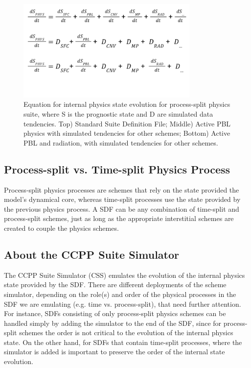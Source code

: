 \begin{figure}[h]
    \centering
    \includegraphics[width=0.80\textwidth]{images/CSS_tendency_schematic.png}
    \caption{Equation for internal physics state evolution for process-split physics suite, where S is the prognostic state and D are simulated data tendencies. Top) Standard Suite Definition File; Middle) Active PBL physics with simulated tendencies for other schemes; Bottom) Active PBL and radiation, with simulated tendencies for other schemes.}
    \label{fig:CSS_tendency_schematic}
\end{figure}

\subsection{Process-split vs. Time-split Physics Process}

Process-split physics processes are schemes that rely on the state provided the model's dynamical core, whereas time-split processes use the state provided by the previous physics process. A SDF can be any combination of time-split and process-split schemes, just as long as the appropriate interstitial schemes are created to couple the physics schemes.

\subsection{About the CCPP Suite Simulator}

The CCPP Suite Simulator (CSS) emulates the evolution of the internal physics state provided by the SDF. There are different deployments of the scheme simulator, depending on the role(s) and order of the physical processes in the SDF we are emulating (e.g. time vs. process-split), that need further attention. For instance, SDFs consisting of only process-split physics schemes can be handled simply by adding the simulator to the end of the SDF, since for process-split schemes the order is not critical to the evolution of the internal physics state. On the other hand, for SDFs that contain time-split processes, where the simulator is added is important to preserve the order of the internal state evolution.

